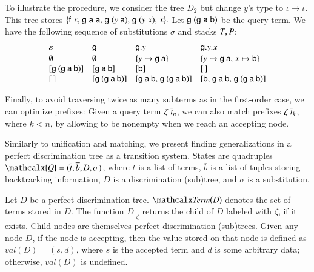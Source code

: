 To illustrate the procedure, we consider the tree $D_2$ but change $y$'s type
to $\iota \to \iota.$ This tree stores
$\{
\mathsf{f}\; x
{,}\allowbreak\;
\mathsf{g}\; \mathsf{a}\; \mathsf{a}
{,}\allowbreak\;
\mathsf{g}\; (y\; \mathsf{a})
{,}\allowbreak\;
\mathsf{g}\; (y\; x)
{,}\allowbreak\;
x
\}.$
Let $\mathsf{g}\; (\mathsf{g}\;\mathsf{a}\;\mathsf{b})$ be the query term.
We have the following sequence of substitutions $\sigma$ and stacks
$T, P$:
%
\[\begin{array}{@{}l@{\kern1em}l@{\kern1em}l@{\kern1em}l@{}}
\varepsilon & \cst{g} & \cst{g}.y & \cst{g}.y.x \\[.5\jot]
\emptyset & \emptyset & \{y \mapsto \cst{g}\> \cst{a}\} & \{y \mapsto \cst{g}\> \cst{a}{,}\; x \mapsto \cst{b}\} \\[0pt]
[\cst{g}\> (\cst{g}\> \cst{a}\> \cst{b})] & [\cst{g}\> \cst{a}\> \cst{b}] & [\cst{b}] & [\,] \\[0pt]
[\,] & [\cst{g}\> (\cst{g}\> \cst{a}\> \cst{b})] & [\cst{g}\> \cst{a}\> \cst{b}{,}\;\cst{g}\> (\cst{g}\> \cst{a}\> \cst{b})] & [\cst{b}{,}\;\cst{g}\> \cst{a}\> \cst{b}{,}\;\cst{g}\> (\cst{g}\> \cst{a}\> \cst{b})]
\end{array}\]

%
Finally, to avoid traversing twice as many subterms as in the first-order
case, we can optimize prefixes: Given a
query term $\zeta\;\overline{t}_{n}$, we can also match prefixes
$\zeta\;\overline{t}_{k}$, where $k < n$, by allowing \TermStack{} to be nonempty when we reach an accepting node.

\newcommand\quadruple{\mathcalx{Q}}
Similarly to unification and matching, we present finding generalizations
in a perfect discrimination tree as a transition system. States
are quadruples $\quadruple = (\overline{t}, \overline{b}, \mathit{D}, \sigma)$, where
$\overline{t}$ is a list of terms, $\overline{b}$ is a list of tuples storing
backtracking information, $\mathit{D}$ is a discrimination
(sub)tree, and $\sigma$ is a substitution.


Let $D$ be a perfect discrimination tree. $\Term(D)$ denotes the set of terms
stored in $D$. The function $D|_\zeta$ returns the child of $D$ labeled with
$\zeta$, if it exists. Child nodes are themselves perfect discrimination
(sub)trees. Given any node $D$, if the node is accepting, then the value stored
on that node is defined as $\mathit{val}(D) = (s, d)$, where $s$ is the
accepted term and $d$ is some arbitrary data;
otherwise, $\mathit{val}(D)$ is undefined.

